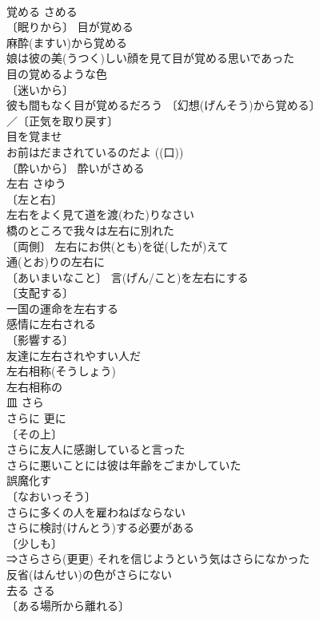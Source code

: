 \documentclass[8pt]{extreport}
\begin{document}
\begin{CJK}{UTF8}{min}
\\	覚める	さめる	
\\	〔眠りから〕 目が覚める 
\\	麻酔(ますい)から覚める 
\\	娘は彼の美(うつく)しい顔を見て目が覚める思いであった 
\\	目の覚めるような色 
\\	〔迷いから〕
\\	彼も間もなく目が覚めるだろう 〔幻想(げんそう)から覚める〕
\\	／〔正気を取り戻す〕
\\	目を覚ませ
\\	お前はだまされているのだよ ((口)) 
\\	〔酔いから〕 酔いがさめる 
\\	左右	さゆう	
\\	〔左と右〕
\\	左右をよく見て道を渡(わた)りなさい 
\\	橋のところで我々は左右に別れた 
\\	〔両側〕 左右にお供(とも)を従(したが)えて 
\\	通(とお)りの左右に 
\\	〔あいまいなこと〕 言(げん/こと)を左右にする 
\\	〔支配する〕
\\	一国の運命を左右する 
\\	感情に左右される 
\\	〔影響する〕
\\	友達に左右されやすい人だ 
\\	左右相称(そうしょう) 
\\	左右相称の 
\\	皿	さら	
\\	さらに	更に	
\\	〔その上〕
\\	さらに友人に感謝していると言った 
\\	さらに悪いことには彼は年齢をごまかしていた 
\\	誤魔化す　
\\	〔なおいっそう〕
\\	さらに多くの人を雇わねばならない 
\\	さらに検討(けんとう)する必要がある 
\\	〔少しも〕
\\	⇒さらさら(更更) それを信じようという気はさらになかった 
\\	反省(はんせい)の色がさらにない 
\\	去る	さる	
\\	〔ある場所から離れる〕

\end{CJK}
\end{document}
